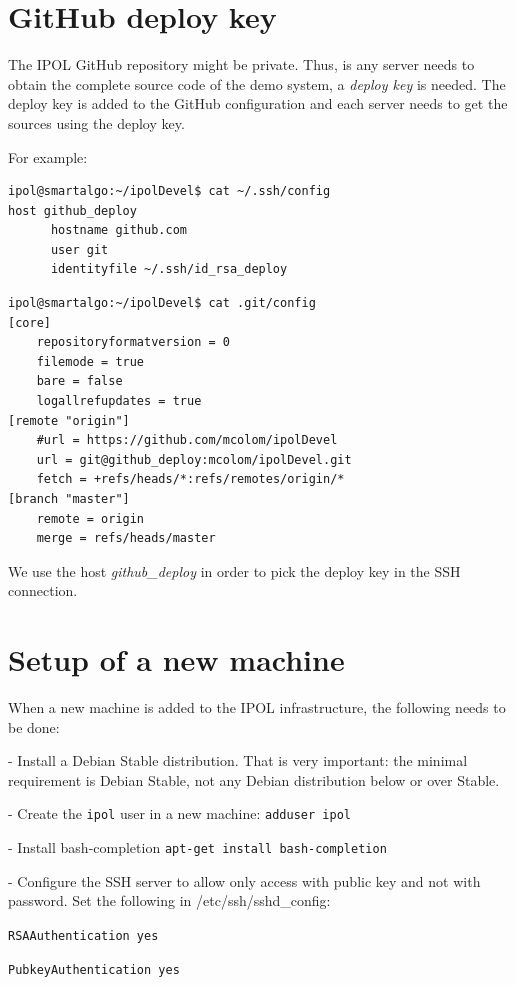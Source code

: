 \documentclass[a4paper,12pt]{article}
\begin{document}
\section{GitHub deploy key}
The IPOL GitHub repository might be private. Thus, is any server needs to obtain the complete source code of the demo system, a \emph{deploy key} is needed. The deploy key is added to the GitHub configuration and each server needs to get the sources using the deploy key.

For example:

\begin{verbatim}
ipol@smartalgo:~/ipolDevel$ cat ~/.ssh/config
host github_deploy
      hostname github.com
      user git
      identityfile ~/.ssh/id_rsa_deploy
\end{verbatim}

\vspace{0.15cm}

\begin{verbatim}
ipol@smartalgo:~/ipolDevel$ cat .git/config
[core]
	repositoryformatversion = 0
	filemode = true
	bare = false
	logallrefupdates = true
[remote "origin"]
	#url = https://github.com/mcolom/ipolDevel
	url = git@github_deploy:mcolom/ipolDevel.git
	fetch = +refs/heads/*:refs/remotes/origin/*
[branch "master"]
	remote = origin
	merge = refs/heads/master
\end{verbatim}

We use the host \emph{github\_deploy} in order to pick the deploy key in the SSH connection.

\section{Setup of a new machine}
When a new machine is added to the IPOL infrastructure, the following needs to be done:

- Install a Debian Stable distribution. That is very important: the minimal requirement is Debian Stable, not any Debian distribution below or over Stable.

- Create the {\tt ipol} user in a new machine: {\tt adduser ipol}

- Install bash-completion {\tt apt-get install bash-completion}

- Configure the SSH server to allow only access with public key and not with password. Set the following in /etc/ssh/sshd\_config:

{\tt RSAAuthentication yes}

{\tt PubkeyAuthentication yes}
\end{document}
